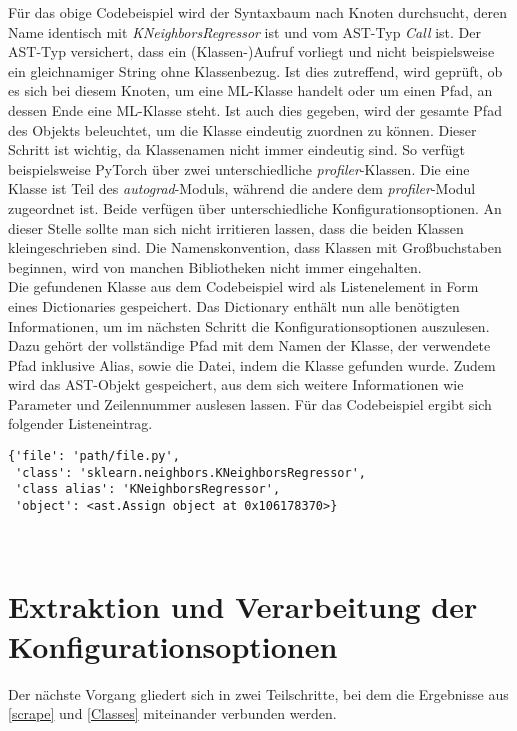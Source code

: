 \documentclass[german,bachelor]{swsLeipzig}
\begin{document}
Für das obige Codebeispiel wird der Syntaxbaum nach Knoten durchsucht, deren Name identisch mit \textit{KNeighborsRegressor} ist und
vom AST-Typ \textit{Call} ist.
Der AST-Typ versichert, dass ein (Klassen-)Aufruf vorliegt und nicht beispielsweise ein gleichnamiger String ohne Klassenbezug.
Ist dies zutreffend, wird geprüft, ob es sich bei diesem Knoten, um eine ML-Klasse handelt oder um einen Pfad, an dessen Ende eine ML-Klasse steht.
Ist auch dies gegeben, wird der gesamte Pfad des Objekts beleuchtet, um die Klasse eindeutig zuordnen zu können.
Dieser Schritt ist wichtig, da Klassenamen nicht immer eindeutig sind.
So verfügt beispielsweise PyTorch über zwei unterschiedliche \textit{profiler}-Klassen.
Die eine Klasse ist Teil des \textit{autograd}-Moduls, während die andere dem \textit{profiler}-Modul zugeordnet ist.
Beide verfügen über unterschiedliche Konfigurationsoptionen.
An dieser Stelle sollte man sich nicht irritieren lassen, dass die beiden Klassen kleingeschrieben sind.
Die Namenskonvention, dass Klassen mit Großbuchstaben beginnen, wird von manchen Bibliotheken nicht immer eingehalten.\\

Die gefundenen Klasse aus dem Codebeispiel wird als Listenelement in Form eines Dictionaries gespeichert.
Das Dictionary enthält nun alle benötigten Informationen, um im nächsten Schritt
die Konfigurationsoptionen auszulesen.
Dazu gehört der vollständige Pfad mit dem Namen der Klasse, der verwendete Pfad inklusive Alias, sowie die Datei, indem
die Klasse gefunden wurde.
Zudem wird das AST-Objekt gespeichert, aus dem sich weitere Informationen wie Parameter und Zeilennummer auslesen lassen.
Für das Codebeispiel ergibt sich folgender Listeneintrag.\\

\noindent\begin{minipage}{\linewidth}
\begin{lstlisting}[frame=single, label=class_dict, basicstyle=\small, caption={Dictionary-Eintrag der KNeighborsRegressor-Klasse},captionpos=b]
{'file': 'path/file.py',
 'class': 'sklearn.neighbors.KNeighborsRegressor',
 'class alias': 'KNeighborsRegressor',
 'object': <ast.Assign object at 0x106178370>}
\end{lstlisting}
\end{minipage}
\

\section{Extraktion und Verarbeitung der Konfigurationsoptionen} \label{Parameters}
Der nächste Vorgang gliedert sich in zwei Teilschritte, bei dem die Ergebnisse aus \ref{scrape} und \ref{Classes} miteinander
verbunden werden.
\end{document}
